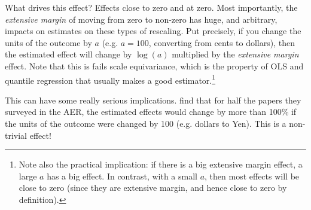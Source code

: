 \documentclass{tufte-handout}
\theoremstyle{break}
\begin{document}
What drives this effect? Effects close to zero and at zero. Most importantly, the \emph{extensive margin} of moving from zero to non-zero has huge, and arbitrary, impacts on estimates on these types of rescaling. Put precisely, if you change the units of the outcome by $a$ (e.g. $a=100$, converting from cents to dollars), then the estimated effect will change by $\log(a)$ multiplied by the \emph{extensive margin} effect. Note that this is fails scale equivariance, which is the property of OLS and quantile regression that usually makes a good estimator.\footnote{Note also the practical implication: if there is a big extensive margin effect, a large $a$ has a big effect. In contrast, with a small $a$, then most effects will be close to zero (since they are extensive margin, and hence close to zero by definition).} 

This can have some really serious implications. \citet{chen2023logs} find that for half the papers they surveyed in the AER, the estimated effects would change by more than 100\% if the units of the outcome were changed by 100 (e.g. dollars to Yen). This is a non-trivial effect! 
\end{document}
